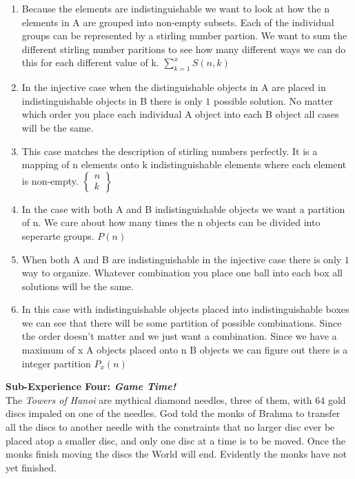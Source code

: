 \documentclass[10pt, AMS Euler]{article}
\begin{document}
\begin{enumerate}
			\item Because the elements are indistinguishable we want to look at how the n elements in A are grouped into non-empty subsets. Each of the individual groups can be represented by a stirling number partion. We want to sum the different stirling number paritions to see how many different ways we can do this for each different value of k. 
			$\boxed{\sum_{k=1}^{x} S(n, k)}$
			\item In the injective case when the distinguishable objects in A are placed in indistinguishable objects in B there is only $\boxed{1}$ possible solution. No matter which order you place each individual A object into each B object all cases will be the same.  
			\item This case matches the description of stirling numbers perfectly. It is a mapping of n elements onto k indistinguishable elements where each element is non-empty.
			$\boxed{\begin{Bmatrix}
						n \\
						k
			\end{Bmatrix}}$
			\item In the case with both A and B indistinguishable objects we want a partition of n. We care about how many times the n objects can be divided into seperarte groups. $\boxed{P(n)}$ 
			\item When both A and B are indistinguishable in the injective case there is only $\boxed{1}$ way to organize. Whatever combination you place one ball into each box all solutions will be the same.
			\item In this case with indistinguishable objects placed into indistinguishable boxes we can see that there will be some partition of possible combinations. Since the order doesn't matter and we just want a combination. Since we have a maximum of x A objects placed onto n B objects we can figure out there is a integer partition $\boxed{P_x(n)}$ 
		\end{enumerate}

	
	
	
	\noindent \maltese \hspace{1ex} {\bf Sub-Experience Four: \emph{Game Time!}}\\
	
	  The \emph{Towers of Hanoi} are mythical diamond needles, three of them, with $64$ gold discs impaled on one of the needles.  God told the monks of Brahma to transfer all the discs to another needle with the constraints that no larger disc ever be placed atop a smaller disc, and only one disc at a time is to be moved.  Once the monks finish moving the discs the World will end.  Evidently the monks have not yet finished. \\    
	
\end{document}
